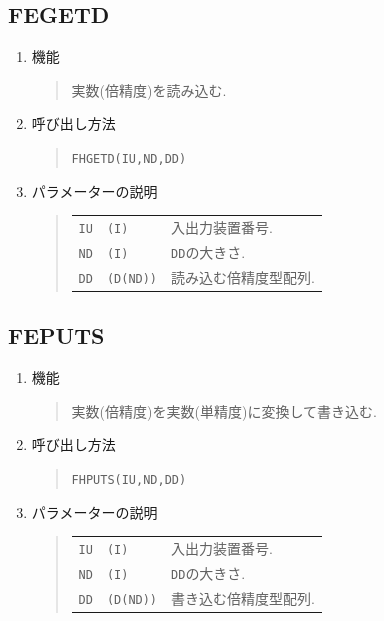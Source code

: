 \subsection{FEGETD}
\begin{enumerate}
  \item 機能 
  \begin{quote}
   実数(倍精度)を読み込む.
  \end{quote}
  \item 呼び出し方法 
  \begin{quote}
    {\tt FHGETD(IU,ND,DD)}
  \end{quote}
  \item パラメーターの説明 
  \begin{quote}
    \begin{tabular}{llp{10cm}}
      {\tt IU}   & {\tt (I)} & 入出力装置番号. \\
      {\tt ND}   & {\tt (I)} & {\tt DD}の大きさ.\\
      {\tt DD}   & {\tt (D(ND))} & 読み込む倍精度型配列.
    \end{tabular}
  \end{quote}
\end{enumerate}

\subsection{FEPUTS}
\begin{enumerate}
  \item 機能
  \begin{quote}
   実数(倍精度)を実数(単精度)に変換して書き込む.
  \end{quote}
  \item 呼び出し方法 
  \begin{quote}
    {\tt FHPUTS(IU,ND,DD)}
  \end{quote}
  \item パラメーターの説明 
  \begin{quote}
    \begin{tabular}{llp{10cm}}
      {\tt IU}   & {\tt (I)} & 入出力装置番号. \\
      {\tt ND}   & {\tt (I)} & {\tt DD}の大きさ.\\
      {\tt DD}   & {\tt (D(ND))} & 書き込む倍精度型配列.
    \end{tabular}
  \end{quote}
\end{enumerate}

